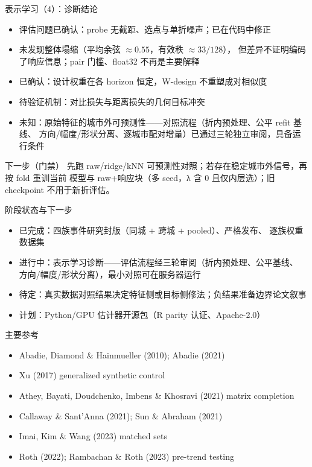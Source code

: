 \documentclass[aspectratio=169,11pt]{beamer}
\begin{document}
\begin{frame}{表示学习（4）：诊断结论}
  \small
  \begin{itemize}
    \item 评估问题已确认：probe 无截距、选点与单折噪声；已在代码中修正
    \item 未发现整体塌缩（平均余弦 $\approx0.55$，有效秩 $\approx33/128$），
      但差异不证明编码了响应信息；pair 门槛、float32 不再是主要解释
    \item 已确认：设计权重在各 horizon 恒定，W-design 不重塑成对相似度
    \item 待验证机制：对比损失与距离损失的几何目标冲突
    \item 未知：原始特征的城市外可预测性——对照流程（折内预处理、公平 refit 基线、
      方向/幅度/形状分离、逐城市配对增量）已通过三轮独立审阅，具备运行条件
  \end{itemize}
  \medskip
  \begin{block}{下一步（门禁）}
    \small 先跑 raw/ridge/kNN 可预测性对照；若存在稳定城市外信号，再按 fold 重训当前
    模型与 raw+响应块（多 seed，λ 含 0 且仅内层选）；旧 checkpoint 不用于新折评估。
  \end{block}
\end{frame}

\begin{frame}{阶段状态与下一步}
  \small
  \begin{itemize}
    \item 已完成：四族事件研究封版（同城 + 跨城 + pooled）、严格发布、
      逐族权重数据集
    \item 进行中：表示学习诊断——评估流程经三轮审阅（折内预处理、公平基线、
      方向/幅度/形状分离），最小对照可在服务器运行
    \item 待定：真实数据对照结果决定特征侧或目标侧修法；负结果准备边界论文叙事
    \item 计划：Python/GPU 估计器开源包（R parity 认证、Apache-2.0）
  \end{itemize}
\end{frame}

\begin{frame}{主要参考}
  \footnotesize
  \begin{itemize}
    \item Abadie, Diamond \& Hainmueller (2010); Abadie (2021)
    \item Xu (2017) generalized synthetic control
    \item Athey, Bayati, Doudchenko, Imbens \& Khosravi (2021) matrix completion
    \item Callaway \& Sant'Anna (2021); Sun \& Abraham (2021)
    \item Imai, Kim \& Wang (2023) matched sets
    \item Roth (2022); Rambachan \& Roth (2023) pre-trend testing
  \end{itemize}
\end{frame}
\end{document}
